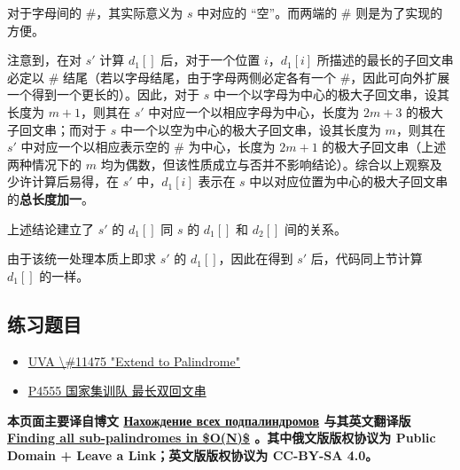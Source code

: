 对于字母间的 $\#$，其实际意义为 $s$ 中对应的 “空”。而两端的 $\#$ 则是为了实现的方便。

注意到，在对 $s'$ 计算 $d_1[]$ 后，对于一个位置 $i$，$d_1[i]$ 所描述的最长的子回文串必定以 $\#$ 结尾（若以字母结尾，由于字母两侧必定各有一个 $\#$，因此可向外扩展一个得到一个更长的）。因此，对于 $s$ 中一个以字母为中心的极大子回文串，设其长度为 $m + 1$，则其在 $s'$ 中对应一个以相应字母为中心，长度为 $2m + 3$ 的极大子回文串；而对于 $s$ 中一个以空为中心的极大子回文串，设其长度为 $m$，则其在 $s'$ 中对应一个以相应表示空的 $\#$ 为中心，长度为 $2m + 1$ 的极大子回文串（上述两种情况下的 $m$ 均为偶数，但该性质成立与否并不影响结论）。综合以上观察及少许计算后易得，在 $s'$ 中，$d_1[i]$ 表示在 $s​$ 中以对应位置为中心的极大子回文串的\textbf{总长度加一}。

上述结论建立了 $s'$ 的 $d_1[]$ 同 $s$ 的 $d_1[]$ 和 $d_2[]$ 间的关系。

由于该统一处理本质上即求 $s'$ 的 $d_1[]$，因此在得到 $s'$ 后，代码同上节计算 $d_1[]$ 的一样。

\subsection{练习题目}

\begin{itemize}
\item \href{https://uva.onlinejudge.org/index.php?option=com_onlinejudge&Itemid=8&page=show_problem&problem=2470}{UVA \textbackslash{}\#11475 "Extend to Palindrome"}
\item \href{https://www.luogu.org/problemnew/show/P4555}{P4555 国家集训队 最长双回文串}
\end{itemize}

\hr

\textbf{本页面主要译自博文 \href{http://e-maxx.ru/algo/palindromes_count}{Нахождение всех подпалиндромов} 与其英文翻译版 \href{https://cp-algorithms.com/string/manacher.html}{Finding all sub-palindromes in \$O(N)\$} 。其中俄文版版权协议为 Public Domain + Leave a Link；英文版版权协议为 CC-BY-SA 4.0。}
